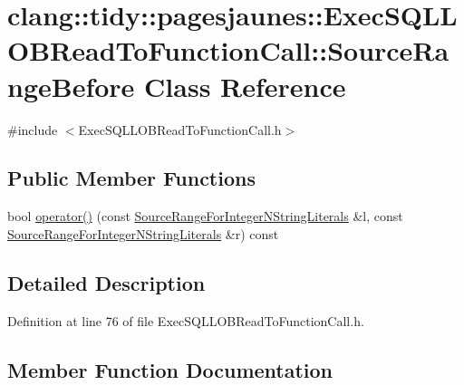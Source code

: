 \hypertarget{classclang_1_1tidy_1_1pagesjaunes_1_1_exec_s_q_l_l_o_b_read_to_function_call_1_1_source_range_before}{}\section{clang\+:\+:tidy\+:\+:pagesjaunes\+:\+:Exec\+S\+Q\+L\+L\+O\+B\+Read\+To\+Function\+Call\+:\+:Source\+Range\+Before Class Reference}
\label{classclang_1_1tidy_1_1pagesjaunes_1_1_exec_s_q_l_l_o_b_read_to_function_call_1_1_source_range_before}


{\ttfamily \#include $<$Exec\+S\+Q\+L\+L\+O\+B\+Read\+To\+Function\+Call.\+h$>$}

\subsection*{Public Member Functions}
\begin{DoxyCompactItemize}
\item 
bool \hyperlink{classclang_1_1tidy_1_1pagesjaunes_1_1_exec_s_q_l_l_o_b_read_to_function_call_1_1_source_range_before_a33866a2f759c32a8088dc8addb3082cc}{operator()} (const \hyperlink{classclang_1_1tidy_1_1pagesjaunes_1_1_exec_s_q_l_l_o_b_read_to_function_call_1_1_source_range_for_integer_n_string_literals}{Source\+Range\+For\+Integer\+N\+String\+Literals} \&l, const \hyperlink{classclang_1_1tidy_1_1pagesjaunes_1_1_exec_s_q_l_l_o_b_read_to_function_call_1_1_source_range_for_integer_n_string_literals}{Source\+Range\+For\+Integer\+N\+String\+Literals} \&r) const
\end{DoxyCompactItemize}


\subsection{Detailed Description}


Definition at line 76 of file Exec\+S\+Q\+L\+L\+O\+B\+Read\+To\+Function\+Call.\+h.



\subsection{Member Function Documentation}
\mbox{\label{classclang_1_1tidy_1_1pagesjaunes_1_1_exec_s_q_l_l_o_b_read_to_function_call_1_1_source_range_before_a33866a2f759c32a8088dc8addb3082cc}} 
